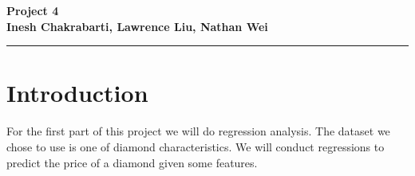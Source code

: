 \documentclass[11pt,letterpaper]{article}
\begin{document}

\begin{center}
    \begin{minipage}{10cm}
    	\begin{center}
    	\textbf{\large Project 4}\\[0.1cm]
        \textbf{Inesh Chakrabarti, Lawrence Liu, Nathan Wei}\\[0.1cm]
    	\end{center}
    \end{minipage}\hfill
\end{center}

\rule{17cm}{0.1mm}


\section*{Introduction}
For the first part of this project we will do regression analysis. The dataset 
we chose to use is one of diamond characteristics. We will conduct regressions
to predict the price of a diamond given some features. 
\end{document}
